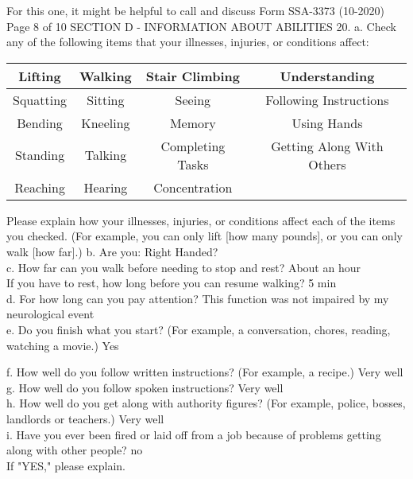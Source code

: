 \documentclass[12pt]{article}
\begin{document}
For this one, it might be helpful to call and discuss
Form SSA-3373 (10-2020)
Page 8 of 10
SECTION D - INFORMATION ABOUT ABILITIES
20. a. Check any of the following items that your illnesses, injuries, or conditions affect:
\begin{tabular}{|c|c|c|c|}
\hline Lifting & Walking & Stair Climbing & Understanding \\
\hline Squatting & Sitting & Seeing & Following Instructions \\
\hline Bending & Kneeling & Memory & Using Hands \\
\hline Standing & Talking & Completing Tasks & Getting Along With Others \\
\hline Reaching & Hearing & Concentration & \\
\hline
\end{tabular}

Please explain how your illnesses, injuries, or conditions affect each of the items you checked. (For example, you can only lift [how many pounds], or you can only walk [how far].)
b. Are you: Right Handed?\\
c. How far can you walk before needing to stop and rest?
About an hour\\
If you have to rest, how long before you can resume walking?
5 min\\
d. For how long can you pay attention?
This function was not impaired by my neurological event\\
e. Do you finish what you start? (For example, a conversation, chores, reading, watching a movie.)
Yes

f. How well do you follow written instructions? (For example, a recipe.)
Very well\\
g. How well do you follow spoken instructions?
Very well\\
h. How well do you get along with authority figures? (For example, police, bosses, landlords or teachers.)
Very well\\
i. Have you ever been fired or laid off from a job because of problems getting along with other people?
no\\
If "YES," please explain.
\end{document}
